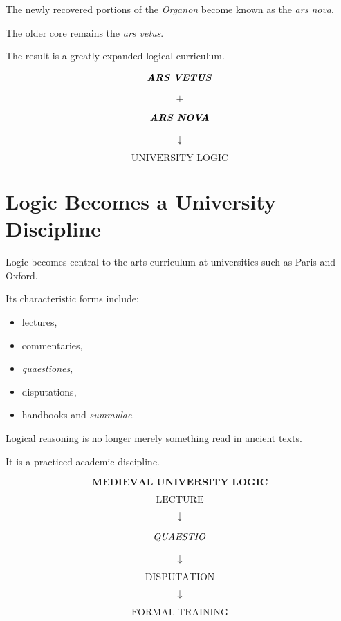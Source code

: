 \documentclass[11pt]{article}
\newcommand{\latin}[1]{\textit{#1}}
\begin{document}
The newly recovered portions of the \textit{Organon} become known
as the \latin{ars nova}.

The older core remains the \latin{ars vetus}.

The result is a greatly expanded logical curriculum.

\begin{whiteboard}
\[
\textbf{\latin{ARS VETUS}}
\]

\[
+
\]

\[
\textbf{\latin{ARS NOVA}}
\]

\[
\downarrow
\]

\[
\boxed{\text{UNIVERSITY LOGIC}}
\]
\end{whiteboard}

\section{Logic Becomes a University Discipline}

Logic becomes central to the arts curriculum at universities such
as Paris and Oxford.

Its characteristic forms include:

\begin{itemize}
    \item lectures,
    \item commentaries,
    \item \latin{quaestiones},
    \item disputations,
    \item handbooks and \latin{summulae}.
\end{itemize}

Logical reasoning is no longer merely something read in ancient
texts.

It is a practiced academic discipline.

\begin{whiteboard}
\[
\textbf{MEDIEVAL UNIVERSITY LOGIC}
\]

\[
\text{LECTURE}
\]

\[
\downarrow
\]

\[
\text{\latin{QUAESTIO}}
\]

\[
\downarrow
\]

\[
\text{DISPUTATION}
\]

\[
\downarrow
\]

\[
\boxed{\text{FORMAL TRAINING}}
\]
\end{whiteboard}
\end{document}
